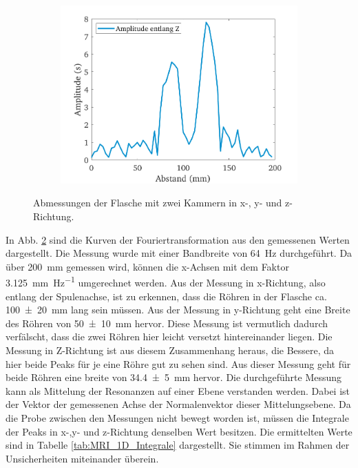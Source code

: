 \documentclass[../../main.tex]{subfiles}
\begin{document}
\begin{figure}[h!]
\begin{subfigure}[c]{0.5\textwidth}
                \includegraphics[width=\linewidth]{Bilddateien/12/Z/Fig_1}
                \label{fig:MRI_1D_Z}
            \end{subfigure}
            \caption{Abmessungen der Flasche mit zwei Kammern in x-, y- und z-Richtung.}
            \label{fig:MRI_1D}
        \end{figure} 
        In Abb. \ref{fig:MRI_1D} sind die Kurven der Fouriertransformation aus den gemessenen Werten dargestellt. Die Messung wurde mit einer Bandbreite von \SI{64}{\hertz} durchgeführt. Da über \SI{200}{\milli \metre} gemessen wird, können die x-Achsen mit dem Faktor \SI{3,125}{\milli \metre \per \hertz} umgerechnet werden. Aus der Messung in x-Richtung, also entlang der Spulenachse, ist zu erkennen, dass die Röhren in der Flasche ca. \SI{100 +- 20}{\milli \metre} lang sein müssen. Aus der Messung in y-Richtung geht eine Breite des Röhren von \SI{50 +- 10}{\milli \metre} hervor. Diese Messung ist vermutlich dadurch verfälscht, dass die zwei Röhren hier leicht versetzt hintereinander liegen. Die Messung in Z-Richtung ist aus diesem Zusammenhang heraus, die Bessere, da hier beide Peaks für je eine Röhre gut zu sehen sind. Aus dieser Messung geht für beide Röhren eine breite von \SI{34,4 +- 5}{\milli \metre} hervor. Die durchgeführte Messung kann als Mittelung der Resonanzen auf einer Ebene verstanden werden. Dabei ist der Vektor der gemessenen Achse der Normalenvektor dieser \glqq{}Mittelungsebene\grqq{}. Da die Probe zwischen den Messungen nicht bewegt worden ist, müssen die Integrale der Peaks in x-,y- und z-Richtung denselben Wert besitzen. Die ermittelten Werte sind in Tabelle \ref{tab:MRI_1D_Integrale} dargestellt. Sie stimmen im Rahmen der Unsicherheiten miteinander überein.
\end{document}
